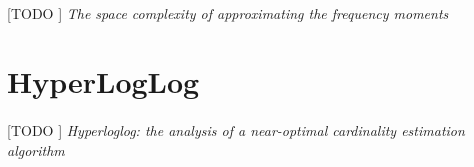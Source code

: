 \documentclass{subfiles}
\begin{document}
      \paragraph{}
      [TODO ] \emph{The space complexity of approximating the frequency moments} \cite{alon1996space}

    \section{HyperLogLog}
    \label{sec:hyper_log_log}

      \paragraph{}
      [TODO ] \emph{Hyperloglog: the analysis of a near-optimal cardinality estimation algorithm} \cite{flajolet2007hyperloglog}
\end{document}
